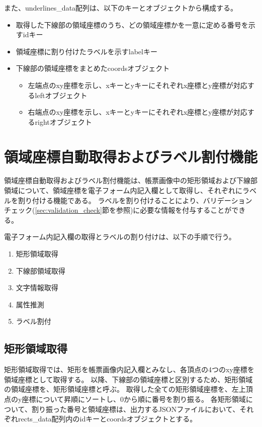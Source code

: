 また、underlines\_data配列は、以下のキーとオブジェクトから構成する。

\begin{itemize}
    \item 取得した下線部の領域座標のうち、どの領域座標かを一意に定める番号を示すidキー
    \item 領域座標に割り付けたラベルを示すlabelキー
    \item 下線部の領域座標をまとめたcoordsオブジェクト
    \begin{itemize}
        \item 左端点のxy座標を示し、xキーとyキーにそれぞれx座標とy座標が対応するleftオブジェクト
        \item 右端点のxy座標を示し、xキーとyキーにそれぞれx座標とy座標が対応するrightオブジェクト
    \end{itemize}
\end{itemize}

\section{領域座標自動取得およびラベル割付機能}\label{sec:eform_write_space_obtainment_feature}
領域座標自動取得およびラベル割付機能は、帳票画像中の矩形領域および下線部領域について、領域座標を電子フォーム内記入欄として取得し、それぞれにラベルを割り付ける機能である。
ラベルを割り付けることにより、バリデーションチェック(\ref{sec:validation_check}節を参照)に必要な情報を付与することができる。

電子フォーム内記入欄の取得とラベルの割り付けは、以下の手順で行う。

\begin{enumerate}
    \item 矩形領域取得
    \item 下線部領域取得
    \item 文字情報取得
    \item 属性推測
    \item ラベル割付
\end{enumerate}

\subsection{矩形領域取得}\label{subsec:rect_coords_obtainment}
矩形領域取得では、矩形を帳票画像内記入欄とみなし、各頂点の4つのxy座標を領域座標として取得する。
以降、下線部の領域座標と区別するため、矩形領域の領域座標を、矩形領域座標と呼ぶ。
取得した全ての矩形領域座標を、左上頂点のy座標について昇順にソートし、0から順に番号を割り振る。
各矩形領域について、割り振った番号と領域座標は、出力するJSONファイルにおいて、それぞれrects\_data配列内のidキーとcoordsオブジェクトとする。

